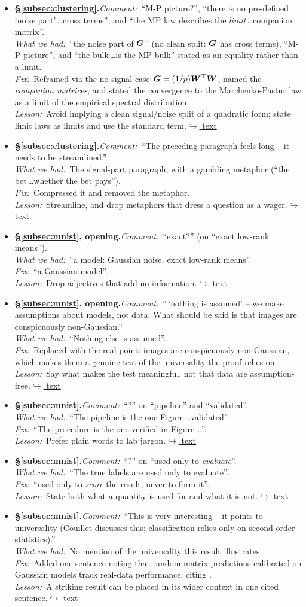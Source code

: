 \documentclass[12pt]{article}
\newcommand{\gdlogentry}[6]{%
  \item[\textcolor{thesisRev}{$\star$\,\ref{gdrev:#1}}]\hypertarget{gdlog:#1}{}%
  \textbf{#2.}\enspace\emph{Comment:}~#3\\
  \emph{What we had:}~#4\\
  \emph{Fix:}~#5\\
  \emph{Lesson:}~#6\enspace\hyperlink{gdtext:#1}{\textcolor{thesisLink}{$\hookrightarrow$ text}}}
\begin{document}
\begin{itemize}[leftmargin=2.4em,itemsep=0.55em]
\gdlogentry{r4-noise-part}{\S\ref{subsec:clustering}}{``M-P picture?'', ``there is no pre-defined `noise part'\,\dots cross terms'', and ``the MP law describes the \emph{limit}\,\dots companion matrix''.}{``the noise part of \(\bm{G}\)'' (no clean split: \(\bm{G}\) has cross terms), ``M-P picture'', and ``the bulk\,\dots is the MP bulk'' stated as an equality rather than a limit.}{Reframed via the no-signal case \(\bm{G} = (1/p)\bm{W}^{\top}\bm{W}\), named the \emph{companion matrices}, and stated the convergence to the Marchenko-Pastur law as a limit of the empirical spectral distribution.}{Avoid implying a clean signal/noise split of a quadratic form; state limit laws as limits and use the standard term.}

\gdlogentry{r4-signal-streamline}{\S\ref{subsec:clustering}}{``The preceding paragraph feels long -- it needs to be streamlined.''}{The signal-part paragraph, with a gambling metaphor (``the bet\,\dots whether the bet pays'').}{Compressed it and removed the metaphor.}{Streamline, and drop metaphors that dress a question as a wager.}

\gdlogentry{r4-mnist-exact}{\S\ref{subsec:mnist}, opening}{``exact?'' (on ``exact low-rank means'').}{``a model: Gaussian noise, exact low-rank means''.}{``a Gaussian model''.}{Drop adjectives that add no information.}

\gdlogentry{r4-nongaussian}{\S\ref{subsec:mnist}, opening}{``\,`nothing is assumed' -- we make assumptions about models, not data. What should be said is that images are conspicuously non-Gaussian.''}{``Nothing else is assumed''.}{Replaced with the real point: images are conspicuously non-Gaussian, which makes them a genuine test of the universality the proof relies on.}{Say what makes the test meaningful, not that data are assumption-free.}

\gdlogentry{r4-procedure}{\S\ref{subsec:mnist}}{``?'' on ``pipeline'' and ``validated''.}{``The pipeline is the one Figure\,\dots validated''.}{``The procedure is the one verified in Figure\,\dots''.}{Prefer plain words to lab jargon.}

\gdlogentry{r4-evaluate}{\S\ref{subsec:mnist}}{``?'' on ``used only to \emph{evaluate}''.}{``The true labels are used only to evaluate''.}{``used only to \emph{score} the result, never to form it''.}{State both what a quantity is used for and what it is not.}

\gdlogentry{r4-universality}{\S\ref{subsec:mnist}}{``This is very interesting -- it points to universality (Couillet discusses this; classification relies only on second-order statistics).''}{No mention of the universality this result illustrates.}{Added one sentence noting that random-matrix predictions calibrated on Gaussian models track real-data performance, citing \citet{CouilletLiao2022}.}{A striking result can be placed in its wider context in one cited sentence.}


\end{itemize}
\end{document}
